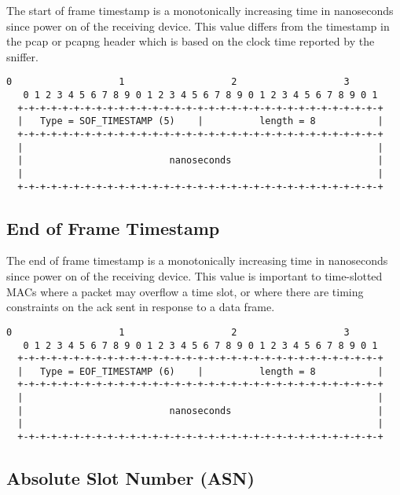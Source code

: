 \documentclass[12pt]{article}
\renewcommand\_{\textunderscore\allowbreak}
\begin{document}
The start of frame timestamp is a monotonically increasing time in nanoseconds
since power on of the receiving device.  This value differs from the timestamp
in the pcap or pcapng header which is based on the clock time reported by the
sniffer.

\begin{Verbatim}[samepage=true]
   0                   1                   2                   3
   0 1 2 3 4 5 6 7 8 9 0 1 2 3 4 5 6 7 8 9 0 1 2 3 4 5 6 7 8 9 0 1
  +-+-+-+-+-+-+-+-+-+-+-+-+-+-+-+-+-+-+-+-+-+-+-+-+-+-+-+-+-+-+-+-+
  |   Type = SOF_TIMESTAMP (5)    |          length = 8           |
  +-+-+-+-+-+-+-+-+-+-+-+-+-+-+-+-+-+-+-+-+-+-+-+-+-+-+-+-+-+-+-+-+
  |                                                               |
  |                          nanoseconds                          |
  |                                                               |
  +-+-+-+-+-+-+-+-+-+-+-+-+-+-+-+-+-+-+-+-+-+-+-+-+-+-+-+-+-+-+-+-+
\end{Verbatim}

\subsection{End of Frame Timestamp}

The end of frame timestamp is a monotonically increasing time in nanoseconds
since power on of the receiving device.  This value is important to
time-slotted MACs where a packet may overflow a time slot, or where there are
timing constraints on the ack sent in response to a data frame.

\begin{Verbatim}[samepage=true]
   0                   1                   2                   3
   0 1 2 3 4 5 6 7 8 9 0 1 2 3 4 5 6 7 8 9 0 1 2 3 4 5 6 7 8 9 0 1
  +-+-+-+-+-+-+-+-+-+-+-+-+-+-+-+-+-+-+-+-+-+-+-+-+-+-+-+-+-+-+-+-+
  |   Type = EOF_TIMESTAMP (6)    |          length = 8           |
  +-+-+-+-+-+-+-+-+-+-+-+-+-+-+-+-+-+-+-+-+-+-+-+-+-+-+-+-+-+-+-+-+
  |                                                               |
  |                          nanoseconds                          |
  |                                                               |
  +-+-+-+-+-+-+-+-+-+-+-+-+-+-+-+-+-+-+-+-+-+-+-+-+-+-+-+-+-+-+-+-+
\end{Verbatim}

\newpage
\subsection{Absolute Slot Number (ASN)}
\end{document}
